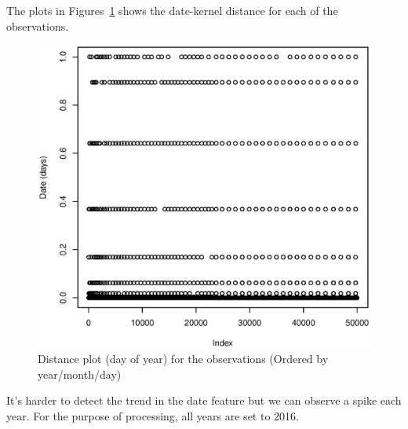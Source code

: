 \documentclass[a4paper, twocolumn]{article}
\begin{document}
    The plots in Figures~\ref{fig:day} shows the date-kernel distance for each of the observations.  
    \begin{figure}[H]
    \centering
    \caption{Distance plot (day of year) for the observations (Ordered by year/month/day)\label{fig:day}}
	    \begin{minipage}[]{0.4\textwidth}
	    	\includegraphics[width=\textwidth]{share/1_date.eps}
	    \end{minipage}
    \end{figure}
	It's harder to detect the trend in the date feature but we can observe a spike each year. For the purpose of processing, all years are set to 2016.
\end{document}
